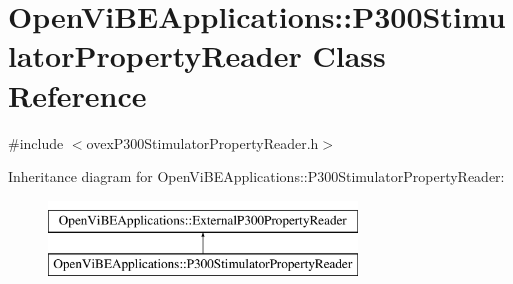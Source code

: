 \hypertarget{classOpenViBEApplications_1_1P300StimulatorPropertyReader}{
\section{OpenViBEApplications::P300StimulatorPropertyReader Class Reference}
\label{classOpenViBEApplications_1_1P300StimulatorPropertyReader}
}


{\ttfamily \#include $<$ovexP300StimulatorPropertyReader.h$>$}

Inheritance diagram for OpenViBEApplications::P300StimulatorPropertyReader:\begin{figure}[H]
\begin{center}
\leavevmode
\includegraphics[height=2.000000cm]{classOpenViBEApplications_1_1P300StimulatorPropertyReader}
\end{center}
\end{figure}
